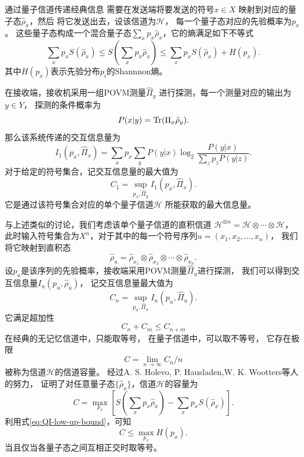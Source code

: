 通过量子信道传递经典信息
需要在发送端将要发送的符号$x \in X$
映射到对应的量子态$\hat{\rho}_x$，然后
将它发送出去，设该信道为$\mathcal{H}$，
每一个量子态对应的先验概率为$p_x$。
这些量子态构成一个混合量子态$\sum_x p_x\hat{\rho}_x$，它的熵满足如下不等式\cite{nielsen2005qcqi}
\begin{equation}
\sum_x p_x S(\hat{\rho}_x) \le S(\sum_x p_x\hat{\rho}_x) \le \sum_x p_x S(\hat{\rho}_x) + H(p_x).
\label{eq:QI-low-up-bound}
\end{equation}
其中$H(p_x)$表示先验分布$p_i$的Shannnon熵。

在接收端，接收机采用一组POVM测量$\hat{\Pi}_y$
进行探测，每一个测量对应的输出为$y \in Y$，
探测的条件概率为
\begin{equation}
P(x|y) = \Tr(\Pi_x \hat{\rho}_y ).
\end{equation}
那么该系统传递的交互信息量为
\begin{equation}
I_1(p_x, \hat{\Pi}_x) = \sum_x p_x \sum_y P(y|x) \log_2  \frac{P(y|x)}{\sum_z p_z P(y|z)}.
\end{equation}
对于给定的符号集合，记交互信息量的最大值为
\begin{equation}
C_1= \sup_{p_x,\hat{\Pi}_y} I_1(p_x, \hat{\Pi}_x).
\end{equation}
它是通过该符号集合对应的单个量子信道$\mathcal{H}$
所能获取的最大信息量。


与上述类似的讨论，我们考虑该单个量子信道的直积信道
$\mathcal{H}^{\otimes n}=\mathcal{H}\otimes\cdots \otimes \mathcal{H}$，
此时输入符号集合为$X^n$，对于其中的每一个符号序列$u = (x_1, x_2, ..., x_n)$，
我们将它映射到直积态
\begin{equation}
\hat{\rho}_u = \hat{\rho}_{x_1}\otimes \hat{\rho}_{x_2}\otimes \cdots \otimes \hat{\rho}_{x_n}.
\end{equation}
设$p_u$是该序列的先验概率，接收端采用POVM测量$\hat{\Pi}_u$进行探测，
我们可以得到交互信息量$I_n(p_u, \hat{\rho}_u)$，
记交互信息量最大值为
\begin{equation}
C_n= \sup_{p_u,\hat{\Pi}_u} I_n(p_u, \hat{\Pi}_u).
\end{equation}
它满足超加性
\begin{equation}
C_n + C_m \le C_{n+m}
\end{equation}
在经典的无记忆信道中，只能取等号，
在量子信道中，可以取不等号，
它存在极限
\begin{equation}
C = \lim_{n \rightarrow \infty} C_n / n
\end{equation}
被称为信道$\mathcal{H}$的信道容量。
经过A. S. Holevo, P. Hausladen,W. K. Wootters等人的努力，
证明了对任意量子态$\{\hat{\rho}_x\}$，信道$\mathcal{H}$的容量为\cite{holevo1973bounds,hausladen1996classical, holevo1996capacity}
\begin{equation}
C = \max_{p_x}\left[ S(\sum_x p_x \hat{\rho}_x) - \sum_x p_x S( \hat{\rho}_x) \right].
\end{equation}
利用式\ref{eq:QI-low-up-bound}，可知
\begin{equation}
C \le \max_{p_x}H(p_x).
\end{equation}
当且仅当各量子态之间互相正交时取等号。

